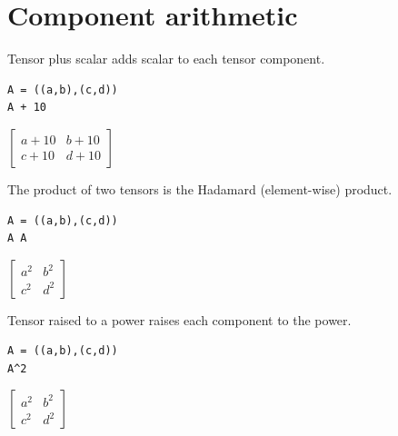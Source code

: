 
\newpage

\section{Component arithmetic}

Tensor plus scalar adds scalar to each tensor component.

{\color{blue}
\begin{verbatim}
A = ((a,b),(c,d))
A + 10
\end{verbatim}}

$\displaystyle
\begin{bmatrix}
a+10 & b+10
\\[1ex]
c+10 & d+10
\end{bmatrix}
$

\bigskip
The product of two tensors is the Hadamard (element-wise) product.

{\color{blue}
\begin{verbatim}
A = ((a,b),(c,d))
A A
\end{verbatim}}

$\displaystyle
\begin{bmatrix}
a^2 & b^2
\\[1ex]
c^2 & d^2
\end{bmatrix}
$

\bigskip

Tensor raised to a power raises each component to the power.

{\color{blue}
\begin{verbatim}
A = ((a,b),(c,d))
A^2
\end{verbatim}}

$\displaystyle
\begin{bmatrix}
a^2 & b^2
\\[1ex]
c^2 & d^2
\end{bmatrix}
$



